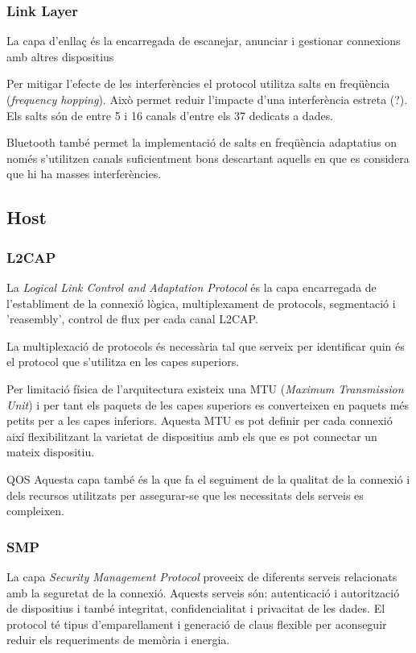 \subsubsection{Link Layer}

La capa d'enllaç és la encarregada de escanejar, anunciar i gestionar connexions amb altres dispositius

Per mitigar l'efecte de les interferències el protocol utilitza salts en freqüència (\textit{frequency hopping}). Això permet reduir l'impacte d'una interferència estreta (?). Els salts són de entre 5 i 16 canals d'entre els 37 dedicats a dades.

Bluetooth també permet la implementació de salts en freqüència adaptatius on només s'utilitzen canals suficientment bons descartant aquells en que es considera que hi ha masses interferències.

\subsection{Host}
\subsubsection{L2CAP}
La \textit{Logical Link Control and Adaptation Protocol} és la capa encarregada de l'establiment de la connexió lògica, multiplexament de protocols, segmentació i 'reasembly', control de flux per cada canal L2CAP.

La multiplexació de protocols és necessària tal que serveix per identificar quin és el protocol que s'utilitza en les capes superiors.

Per limitació física de l'arquitectura existeix una MTU (\textit{Maximum Transmission Unit}) i per tant els paquets de les capes superiors es converteixen en paquets més petits per a les capes inferiors.
Aquesta MTU es pot definir per cada connexió així flexibilitzant la varietat de dispositius amb els que es pot connectar un mateix dispositiu.

QOS Aquesta capa també és la que fa el seguiment de la qualitat de la connexió i dels recursos utilitzats per assegurar-se que les necessitats dels serveis es compleixen.

\subsubsection{SMP}
La capa \textit{Security Management Protocol} proveeix de diferents serveis relacionats amb la seguretat de la connexió.
Aquests serveis són: autenticació i autorització de dispositius i també integritat, confidencialitat i privacitat de les dades.
El protocol té tipus d'emparellament i generació de claus flexible per aconseguir reduir els requeriments de memòria i energia.

